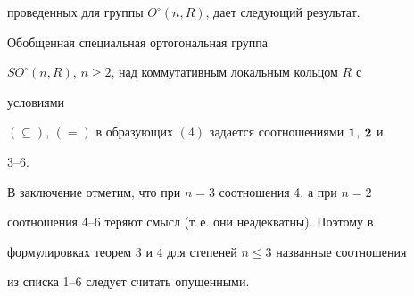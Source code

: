 проведенных для группы $O^\circ(n,R)$, дает следующий результат. 


 


\begin{thm} 


Обобщенная специальная ортогональная группа 


$SO^\circ(n,R)$, $n\ge2$, над коммутативным локальным кольцом $R$ с 


условиями 


$(\subseteq)$, $(=)$ в образующих $(4)$ задается соотношениями $\bold 


1$, $\bold 2$ и 


$3$--$6$. 


\end{thm} 


 


В заключение отметим, что при $n=3$ соотношения 4, а при $n=2$ 


соотношения 4--6 теряют смысл (т.\,е. они неадекватны). Поэтому в 


формулировках теорем 3 и 4 для степеней $n\le3$ названные соотношения 


из списка 1--6 следует считать опущенными. 


 


